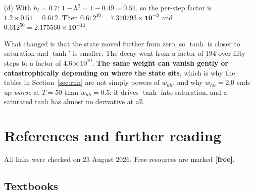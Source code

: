 \documentclass[11pt]{article}
\begin{document}
(d) With $h_t = 0.7$: $1 - h^2 = 1 - 0.49 = 0.51$, so the per-step factor is
$1.2 \times 0.51 = \mathbf{0.612}$. Then $0.612^{10} =
\mathbf{7.370793\times10^{-3}}$ and
$0.612^{50} = \mathbf{2.175560\times10^{-11}}$.

What changed is that the state moved further from zero, so $\tanh$ is closer
to saturation and $\tanh'$ is smaller. The decay went from a factor of $194$
over fifty steps to a factor of $4.6\times10^{10}$. \textbf{The same weight can
vanish gently or catastrophically depending on where the state sits}, which is
why the tables in Section~\ref{sec:rnn} are not simply powers of $w_{hh}$, and
why $w_{hh} = 2.0$ ends up \emph{worse} at $T = 50$ than $w_{hh} = 0.5$: it
drives $\tanh$ into saturation, and a saturated tanh has almost no derivative
at all.

\section{References and further reading}
\label{sec:refs}

All links were checked on 23 August 2026. Free resources are marked
\textbf{[free]}.

\subsection*{Textbooks}
\end{document}
